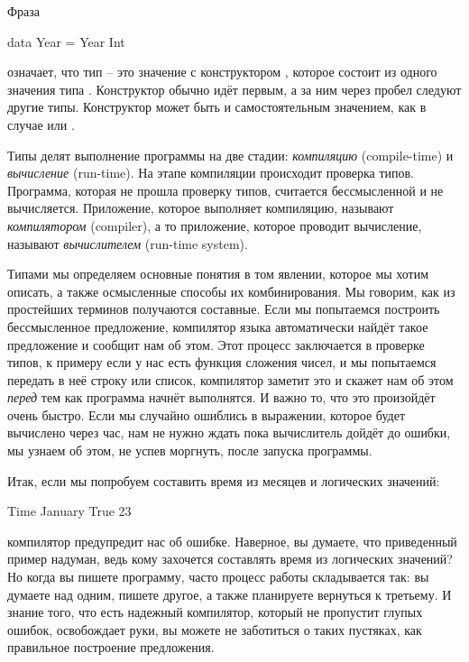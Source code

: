Фраза


\begin{code}
data Year = Year Int
\end{code}

означает, что тип  -- это значение с конструктором ,
которое состоит из одного значения типа . Конструктор обычно
идёт первым, а за ним через пробел следуют другие типы. Конструктор
может быть и самостоятельным значением, как в случае  или
.

Типы делят выполнение программы на две стадии: \emph{компиляцию}
(compile-time) и \emph{вычисление} (run-time). На этапе компиляции
происходит проверка типов. Программа, которая не прошла проверку типов,
считается бессмысленной и не вычисляется. Приложение, которое выполняет
компиляцию, называют \emph{компилятором} (compiler), а то приложение,
которое проводит вычисление, называют \emph{вычислителем} (run-time
system).

Типами мы определяем основные понятия в том явлении, которое мы хотим
описать, а также осмысленные способы их комбинирования. Мы говорим, как
из простейших терминов получаются составные. Если мы попытаемся
построить бессмысленное предложение, компилятор языка автоматически
найдёт такое предложение и сообщит нам об этом. Этот процесс заключается
в проверке типов, к примеру если у нас есть функция сложения чисел, и мы
попытаемся передать в неё строку или список, компилятор заметит это и
скажет нам об этом \emph{перед} тем как программа начнёт выполнятся. И
важно то, что это произойдёт очень быстро. Если мы случайно ошиблись в
выражении, которое будет вычислено через час, нам не нужно ждать пока
вычислитель дойдёт до ошибки, мы узнаем об этом, не успев моргнуть,
после запуска программы.

Итак, если мы попробуем составить время из месяцев и логических
значений:


\begin{code}
Time January True 23
\end{code}

компилятор предупредит нас об ошибке. Наверное, вы думаете, что
приведенный пример надуман, ведь кому захочется составлять время из
логических значений? Но когда вы пишете программу, часто процесс работы
складывается так: вы думаете над одним, пишете другое, а также
планируете вернуться к третьему. И знание того, что есть надежный
компилятор, который не пропустит глупых ошибок, освобождает руки, вы
можете не заботиться о таких пустяках, как правильное построение
предложения.

